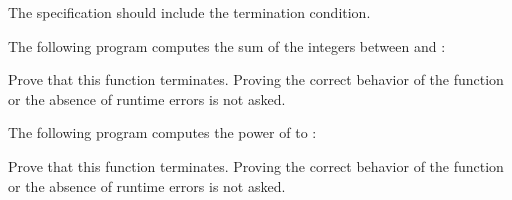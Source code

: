 The specification should include the termination condition.




The following program computes the sum of the integers between 
and :




Prove that this function terminates. Proving the correct behavior of the
function or the absence of runtime errors is not asked.




The following program computes the power of  to :




Prove that this function terminates. Proving the correct behavior of the
function or the absence of runtime errors is not asked.

